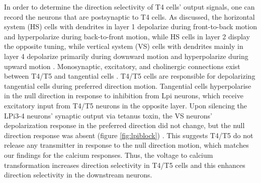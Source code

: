 In order to determine the direction selectivity of T4 cells' output signals, one can record the neurons that are postsynaptic to T4 cells. As discussed, the horizontal system (HS) cells with dendrites in layer 1 depolarize during front-to-back motion and hyperpolarize during back-to-front motion, while HS cells in layer 2 display the opposite tuning, while vertical system (VS) cells with dendrites mainly in layer 4 depolarize primarily during downward motion and hyperpolarize during upward motion \parencite{Schnell2010, Hopp2014, Scott2002}. Monosynaptic, excitatory, and cholinergic connections exist between T4/T5 and tangential cells \parencite{Mauss2014}. T4/T5 cells are responsible for depolarizing tangential cells during preferred direction motion. Tangential cells hyperpolarise in the null direction in response to inhibition from Lpi neurons, which receive excitatory input from T4/T5 neurons in the opposite layer. Upon silencing the LPi3-4 neurons’ synaptic output via tetanus toxin, the VS neurons' depolarization response in the preferred direction did not change, but the null direction response was absent (figure \ref{fig:lpiblock}) \parencite{Mauss2015}. This suggests T4/T5 do not release any transmitter in response to the null direction motion, which matches our findings for the calcium responses. Thus, the voltage to calcium transformation increases direction selectivity in T4/T5 cells and this enhances direction selectivity in the downstream neurons.

